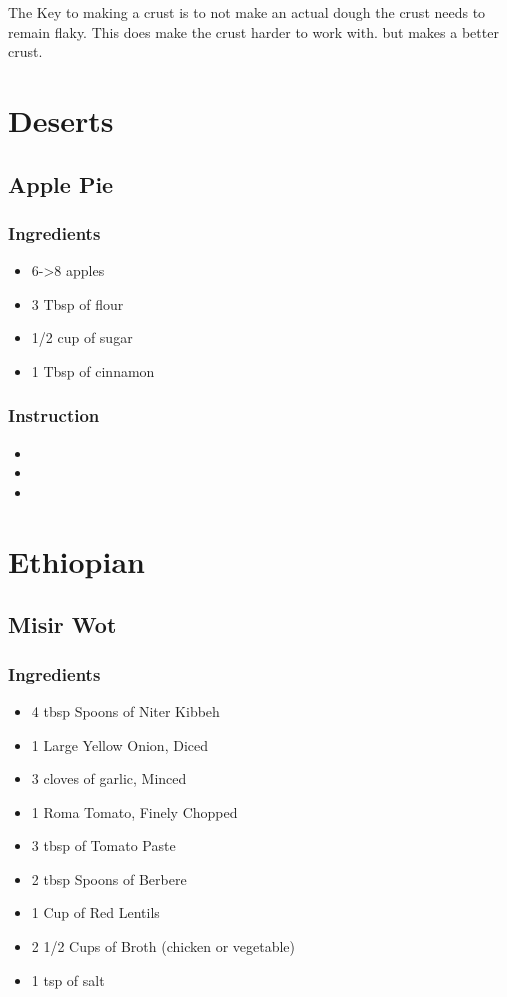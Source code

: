 \documentclass[11pt]{article}
\begin{document}
The Key to making a crust is to not make an actual dough the crust needs to remain flaky.
This does make the crust harder to work with. but makes a better crust.
\section{Deserts}
\label{sec:org8449bcf}
\subsection{Apple Pie}
\label{sec:org0addaa9}
\subsubsection*{Ingredients}
\label{sec:org27ab885}
\begin{itemize}
\item 6->8 apples
\item 3 Tbsp of flour
\item 1/2 cup of sugar
\item 1 Tbsp of cinnamon
\end{itemize}
\subsubsection*{Instruction}
\label{sec:org9b24014}
\begin{itemize}
\item 

\item 

\item 
\end{itemize}
\section{Ethiopian}
\label{sec:org7be566f}
\subsection{Misir Wot}
\label{sec:org4db90c9}
\subsubsection*{Ingredients}
\label{sec:orgbdcf25a}
\begin{itemize}
\item 4 tbsp Spoons of Niter Kibbeh
\item 1 Large Yellow Onion, Diced
\item 3 cloves of garlic, Minced
\item 1 Roma Tomato, Finely Chopped
\item 3 tbsp of Tomato Paste
\item 2 tbsp Spoons of Berbere
\item 1 Cup of Red Lentils
\item 2 1/2 Cups of Broth (chicken or vegetable)
\item 1 tsp of salt
\end{itemize}
\end{document}
